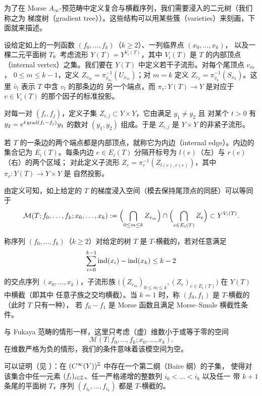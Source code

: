 为了在 Morse $A_\infty$-预范畴中定义复合与横截序列，我们需要浸入的二元树（我们称之为
梯度树（gradient tree））。这些结构可以用某些簇（varieties）来刻画，下面就来描述。

设给定如上的一列函数 $(f_0,\dots,f_k)$（$k\ge2$）、一列临界点 $(x_0,\dots,x_k)$，
以及一棵二元平面树 $T$。考虑流形 $Y(T)=Y^{V_i(T)}$，其中 $V_i(T)$ 是 $T$ 的内部顶点
（internal vertex）之集。我们要在 $Y(T)$ 中定义若干子流形。对每个尾顶点 $v_m$，
$0\le m\le k-1$，定义 $Z_{v_m}=\pi_{\hat v_m}^{-1}(U_{x_m})$；对 $m=k$ 定义
$Z_{v_k}=\pi_{\hat v_k}^{-1}(S_{x_k})$。这里 $\hat v_l$ 表示 $T$ 中含 $v_l$ 的那条边的
另一个端点，而 $\pi_v:Y(T)\to Y$ 是对应于 $v\in V_i(T)$ 的那个因子的标准投影。

对每一对 $(f_i,f_j)$，定义子集 $Z_{i,j}\subset Y\times Y$，它由满足 $y_1\ne y_2$ 且
对某个 $t>0$ 有 $y_2=e^{t\operatorname{grad}(f_i-f_j)}y_1$ 的数对 $(y_1,y_2)$ 组成。于是 $Z_{i,j}$
是 $Y\times Y$ 的非紧子流形。

若 $T$ 的一条边的两个端点都是内部顶点，就称它为内边（internal edge）。内边的集合记为
$E_i(T)$。每条内边 $e\in E_i(T)$ 分隔开标号为 $l(e)$（左）与 $r(e)$（右）的两个区域；
对此定义子流形 $Z_e=\pi_e^{-1}(Z_{l(e),r(e)})$，其中 $\pi_e:Y(T)\to Y\times Y$ 是
自然投影。

由定义可知，如上给定的 $T$ 的梯度浸入空间（模去保持尾顶点的同胚）可以等同于
\[
  \mathcal{M}(T;f_0,\dots,f_k;x_0,\dots,x_k):=
  \Bigl(\bigcap_{0\le m\le k}Z_{v_m}\Bigr)\cap\Bigl(\bigcap_{e\in E_i(T)}Z_e\Bigr)
  \subset Y^{V_i(T)}.
\]

\begin{dfn}
称序列 $(f_0,\dots,f_k)$（$k\ge2$）对给定的树 $T$ 是 $T$-横截的，若对任意满足
\[
  \sum_{i=0}^{k-1}\operatorname{ind}(x_i)-\operatorname{ind}(x_k)\le k-2
\]
的交点序列 $(x_0,\dots,x_k)$，子流形族
$\bigl((Z_{v_m})_{0\le m\le k},(Z_e)_{e\in E_i(T)}\bigr)$ 在 $Y(T)$ 中横截（即其中
任意子族之交均横截）。当 $k=1$ 时，称 $(f_0,f_1)$ 是 $T$-横截的（此时 $T$ 只有一种），
若 $f_0-f_1$ 是 Morse 函数且满足 Morse--Smale 横截性条件。
\end{dfn}

\begin{rmk}
与 Fukaya 范畴的情形一样，这里只考虑（虚）维数小于或等于零的空间
\[
  \mathcal{M}(T;f_0,\dots,f_k;x_0,\dots,x_k).
\]
在维数严格为负的情形，我们的条件意味着该模空间为空。
\end{rmk}

可以证明（见 \cite{Fu1}）：在 $(C^\infty(Y))^{\mathbb{Z}}$ 中存在一个第二纲（Baire 纲）的子集，
使得对该集合中任一元素 $(f_i)_{i\in\mathbb{Z}}$、任一严格递增的整数列 $i_0<\dots<i_k$ 以及任一
带 $k+1$ 条尾的平面树 $T$，序列 $(f_{i_0},\dots,f_{i_k})$ 都是 $T$-横截的。

